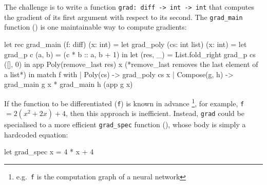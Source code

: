 The challenge is to write a function \texttt{grad: diff -> int -> int} that computes the gradient of its first argument with respect to its second. The \texttt{grad_main} function () is one maintainable way to compute gradients: 

\begin{code}
\begin{ocamllst}
let rec grad_main (f: diff) (x: int) = 
  let grad_poly (cs: int list) (x: int) = 
    let grad_p c (a, b) = (c * b :: a, b + 1) in
    let (res, _) = List.fold_right grad_p cs ([], 0) in 
    app Poly(remove_last res) x (*remove_last removes the last element of a list*)
  in match f with
    | Poly(cs)      -> grad_poly cs x
    | Compose(g, h) -> grad_main g x * grad_main h (app g x)

\end{ocamllst}
%
\label{listing:ocaml-grad-main}
\end{code}


If the function to be differentiated (\texttt{f}) is known in advance \footnote{e.g.\ \texttt{f} is the computation graph of a neural network}, for example, \texttt{f} $= 2(x^2 + 2x) + 4$, then this approach is inefficient. Instead, \texttt{grad} could be specialised to a more efficient \texttt{grad_spec} function (), whose body is simply a hardcoded equation:

\begin{code}
\begin{ocamllst}
let grad_spec x = 4 * x + 4
\end{ocamllst}
\label{listing:ocaml-grad-fast}
\end{code}    

